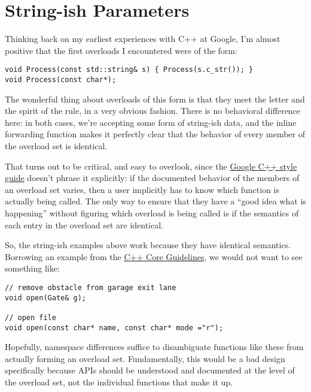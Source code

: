 \section{String-ish Parameters}

Thinking back on my earliest experiences with C++ at Google, I’m almost positive that the first overloads I encountered were of the form:

\begin{verbatim}
void Process(const std::string& s) { Process(s.c_str()); }
void Process(const char*);
\end{verbatim}

The wonderful thing about overloads of this form is that they meet the letter and the spirit of the rule, in a very obvious fashion. There is no behavioral difference here: in both cases, we’re accepting some form of string-ish data, and the inline forwarding function makes it perfectly clear that the behavior of every member of the overload set is identical.

That turns out to be critical, and easy to overlook, since the \hyperref[sec:function-overloading]{Google C++ style guide} doesn’t phrase it explicitly: if the documented behavior of the members of an overload set varies, then a user implicitly has to know which function is actually being called. The only way to ensure that they have a \enquote{good idea what is happening} without figuring which overload is being called is if the semantics of each entry in the overload set are identical.

So, the string-ish examples above work because they have identical semantics. Borrowing an example from the \href{https://isocpp.github.io/CppCoreGuidelines/CppCoreGuidelines#c163-overload-only-for-operations-that-are-roughly-equivalent}{C++ Core Guidelines}, we would not want to see something like:

\begin{verbatim}
// remove obstacle from garage exit lane
void open(Gate& g);

// open file
void open(const char* name, const char* mode ="r");
\end{verbatim}

Hopefully, namespace differences suffice to disambiguate functions like these from actually forming an overload set. Fundamentally, this would be a bad design specifically because APIs should be understood and documented at the level of the overload set, not the individual functions that make it up.

